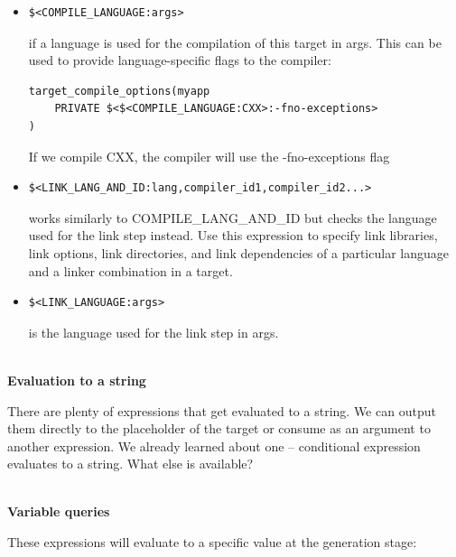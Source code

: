 \begin{itemize}
\item 
\begin{lstlisting}[style=styleCMake]
$<COMPILE_LANGUAGE:args>
\end{lstlisting}

if a language is used for the compilation of this target in args. This can be used to provide language-specific flags to the compiler:

\begin{lstlisting}[style=styleCMake]
target_compile_options(myapp
	PRIVATE $<$<COMPILE_LANGUAGE:CXX>:-fno-exceptions>
)
\end{lstlisting}

If we compile CXX, the compiler will use the -fno-exceptions flag

\item 
\begin{lstlisting}[style=styleCMake]
$<LINK_LANG_AND_ID:lang,compiler_id1,compiler_id2...>
\end{lstlisting}
works similarly to COMPILE\_LANG\_AND\_ID but checks the language used for the link step instead. Use this expression to specify link libraries, link options, link directories, and link dependencies of a particular language and a linker combination in a target.

\item 
\begin{lstlisting}[style=styleCMake]
$<LINK_LANGUAGE:args>
\end{lstlisting}

is the language used for the link step in args.
\end{itemize}

\hspace*{\fill} \\ %
\noindent
\textbf{Evaluation to a string}

There are plenty of expressions that get evaluated to a string. We can output them directly to the placeholder of the target or consume as an argument to another expression. We already learned about one – conditional expression evaluates to a string. What else is available?

\hspace*{\fill} \\ %
\noindent
\textbf{Variable queries}

These expressions will evaluate to a specific value at the generation stage:

